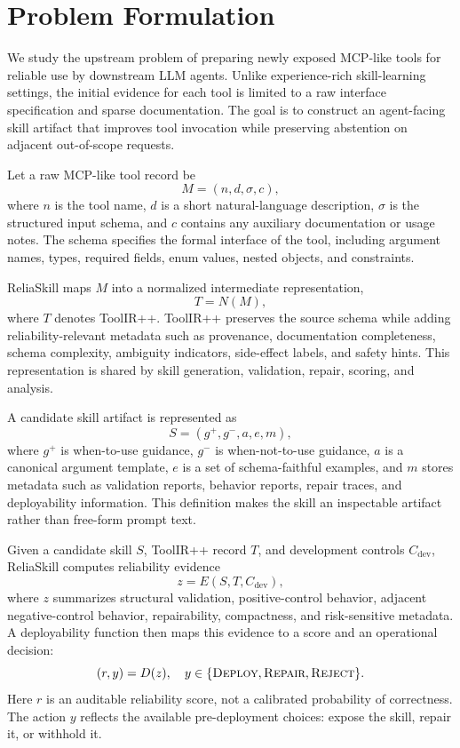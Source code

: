 \documentclass[11pt]{article}
\newcommand{\method}{ReliaSkill}
\begin{document}
\section{Problem Formulation}
\label{sec:problem_formulation}

We study the upstream problem of preparing newly exposed MCP-like tools for reliable use by downstream LLM agents. Unlike experience-rich skill-learning settings, the initial evidence for each tool is limited to a raw interface specification and sparse documentation. The goal is to construct an agent-facing skill artifact that improves tool invocation while preserving abstention on adjacent out-of-scope requests.

Let a raw MCP-like tool record be
\begin{equation}
M = (n, d, \sigma, c),
\end{equation}
where $n$ is the tool name, $d$ is a short natural-language description, $\sigma$ is the structured input schema, and $c$ contains any auxiliary documentation or usage notes. The schema specifies the formal interface of the tool, including argument names, types, required fields, enum values, nested objects, and constraints.

\method{} maps $M$ into a normalized intermediate representation,
\begin{equation}
T = N(M),
\end{equation}
where $T$ denotes ToolIR++. ToolIR++ preserves the source schema while adding reliability-relevant metadata such as provenance, documentation completeness, schema complexity, ambiguity indicators, side-effect labels, and safety hints. This representation is shared by skill generation, validation, repair, scoring, and analysis.

A candidate skill artifact is represented as
\begin{equation}
S = (g^{+}, g^{-}, a, e, m),
\end{equation}
where $g^{+}$ is when-to-use guidance, $g^{-}$ is when-not-to-use guidance, $a$ is a canonical argument template, $e$ is a set of schema-faithful examples, and $m$ stores metadata such as validation reports, behavior reports, repair traces, and deployability information. This definition makes the skill an inspectable artifact rather than free-form prompt text.

Given a candidate skill $S$, ToolIR++ record $T$, and development controls $C_{\mathrm{dev}}$, \method{} computes reliability evidence
\begin{equation}
z = E(S, T, C_{\mathrm{dev}}),
\end{equation}
where $z$ summarizes structural validation, positive-control behavior, adjacent negative-control behavior, repairability, compactness, and risk-sensitive metadata. A deployability function then maps this evidence to a score and an operational decision:
\begin{equation}
(r, y) = D(z),
\quad
y \in \{\textsc{Deploy}, \textsc{Repair}, \textsc{Reject}\}.
\end{equation}
Here $r$ is an auditable reliability score, not a calibrated probability of correctness. The action $y$ reflects the available pre-deployment choices: expose the skill, repair it, or withhold it.
\end{document}
